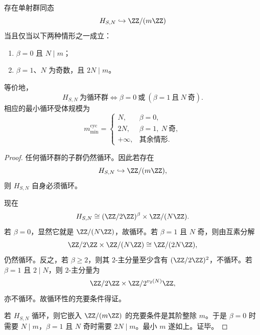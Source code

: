 \begin{theorem}[循环受体的忠实可观测性判据与最小循环规模]\label{thm:conclusion-mixed-hiddenstate-cyclic-receiver-criterion}
存在单射群同态
\[
H_{S,N}\hookrightarrow \ZZ/(m\ZZ)
\]
当且仅当以下两种情形之一成立：
\begin{enumerate}
  \item \(\beta=0\) 且 \(N\mid m\)；
  \item \(\beta=1\)、\(N\) 为奇数，且 \(2N\mid m\)。
\end{enumerate}
等价地，
\[
H_{S,N}\ \text{为循环群}
\iff
\beta=0\ \text{或}\ (\beta=1\ \text{且}\ N\ \text{奇}).
\]
相应的最小循环受体规模为
\[
m_{\min}^{\mathrm{cyc}}=
\begin{cases}
N,& \beta=0,\\[1mm]
2N,& \beta=1,\ N\ \text{奇},\\[1mm]
+\infty,& \text{其余情形}.
\end{cases}
\]
\end{theorem}
\begin{proof}
任何循环群的子群仍然循环。因此若存在
\[
H_{S,N}\hookrightarrow \ZZ/(m\ZZ),
\]
则 \(H_{S,N}\) 自身必须循环。

现在
\[
H_{S,N}\cong (\ZZ/2\ZZ)^\beta\times \ZZ/(N\ZZ).
\]
若 \(\beta=0\)，显然它就是 \(\ZZ/(N\ZZ)\)，故循环。若 \(\beta=1\) 且 \(N\) 奇，则由互素分解
\[
\ZZ/2\ZZ\times \ZZ/(N\ZZ)\cong \ZZ/(2N\ZZ),
\]
仍然循环。反之，若 \(\beta\ge 2\)，则其 \(2\)-主分量至少含有 \((\ZZ/2\ZZ)^2\)，不循环。若 \(\beta=1\) 且 \(2\mid N\)，则 \(2\)-主分量为
\[
\ZZ/2\ZZ\times \ZZ/2^{v_2(N)}\ZZ,
\]
亦不循环。故循环性的充要条件得证。

若 \(H_{S,N}\) 循环，则它嵌入 \(\ZZ/(m\ZZ)\) 的充要条件是其阶整除 \(m\)。于是 \(\beta=0\) 时需要 \(N\mid m\)，\(\beta=1\) 且 \(N\) 奇时需要 \(2N\mid m\)。最小 \(m\) 遂如上。证毕。
\end{proof}


